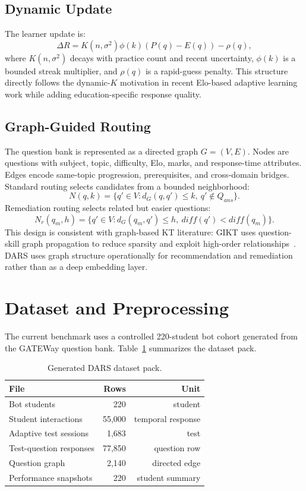 \documentclass[sigconf,nonacm]{acmart}
\begin{document}
\subsection{Dynamic Update}
The learner update is:
\begin{equation}
\Delta R = K(n,\sigma^2)\phi(k)(P(q)-E(q))-\rho(q),
\end{equation}
where $K(n,\sigma^2)$ decays with practice count and recent uncertainty, $\phi(k)$ is a bounded streak multiplier, and $\rho(q)$ is a rapid-guess penalty. This structure directly follows the dynamic-$K$ motivation in recent Elo-based adaptive learning work while adding education-specific response quality.

\subsection{Graph-Guided Routing}
The question bank is represented as a directed graph $G=(V,E)$. Nodes are questions with subject, topic, difficulty, Elo, marks, and response-time attributes. Edges encode same-topic progression, prerequisites, and cross-domain bridges. Standard routing selects candidates from a bounded neighborhood:
\begin{equation}
N(q,k)=\{q'\in V:d_G(q,q')\leq k,\ q'\notin Q_{ans}\}.
\end{equation}
Remediation routing selects related but easier questions:
\begin{equation}
N_r(q_m,h)=\{q'\in V:d_G(q_m,q')\leq h,\ diff(q')<diff(q_m)\}.
\end{equation}
This design is consistent with graph-based KT literature: GIKT uses question-skill graph propagation to reduce sparsity and exploit high-order relationships~\cite{yang2020gikt}. DARS uses graph structure operationally for recommendation and remediation rather than as a deep embedding layer.

\section{Dataset and Preprocessing}
The current benchmark uses a controlled 220-student bot cohort generated from the GATEWay question bank. Table~\ref{tab:data} summarizes the dataset pack.

\begin{table}[t]
\centering
\caption{Generated DARS dataset pack.}
\label{tab:data}
\begin{tabular}{lrr}
\toprule
File & Rows & Unit \\
\midrule
Bot students & 220 & student \\
Student interactions & 55,000 & temporal response \\
Adaptive test sessions & 1,683 & test \\
Test-question responses & 77,850 & question row \\
Question graph & 2,140 & directed edge \\
Performance snapshots & 220 & student summary \\
\bottomrule
\end{tabular}
\end{table}
\end{document}

